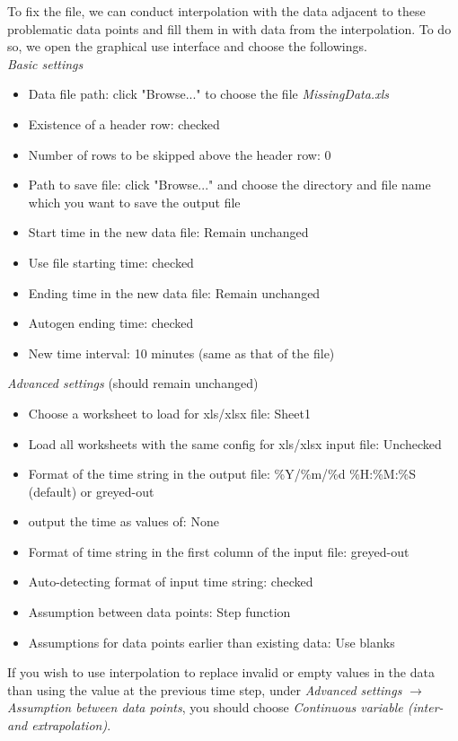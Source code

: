 \documentclass[12pt,a4paper]{article}
\begin{document}
To fix the file, we can conduct interpolation with the data adjacent to these problematic data points and fill them in with data from the interpolation.
To do so, we open the graphical use interface and choose the followings.
\\

\emph{Basic settings}
\begin{itemize}
\item Data file path: click "Browse..." to choose the file \emph{MissingData.xls}
\item Existence of a header row: checked
\item Number of rows to be skipped above the header row: 0
\item Path to save file: click "Browse..." and choose the directory and file name which you want to save the output file
\item Start time in the new data file: Remain unchanged
\item Use file starting time: checked
\item Ending time in the new data file: Remain unchanged
\item Autogen ending time: checked
\item New time interval: 10 minutes (same as that of the file)
\end{itemize}

\emph{Advanced settings} (should remain unchanged)
\begin{itemize}
\item Choose a worksheet to load for xls/xlsx file: Sheet1
\item Load all worksheets with the same config for xls/xlsx input file: Unchecked
\item Format of the time string in the output file: \%Y/\%m/\%d \%H:\%M:\%S (default) or greyed-out
\item output the time as values of: None
\item Format of time string in the first column of the input file: greyed-out
\item Auto-detecting format of input time string: checked
\item Assumption between data points: Step function
\item Assumptions for data points earlier than existing data: Use blanks
\end{itemize}

If you wish to use interpolation to replace invalid or empty values in the data than using the value at the previous time step, under \emph{Advanced settings} $\rightarrow$ \emph{Assumption between data points}, you should choose \emph{Continuous variable (inter- and extrapolation)}.
\end{document}
